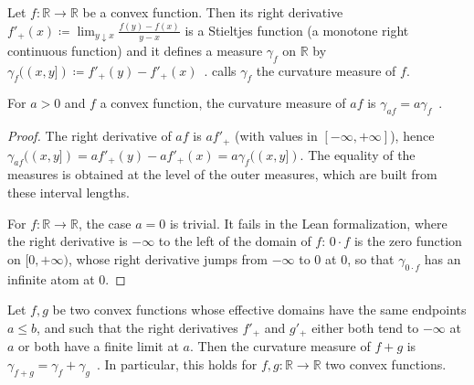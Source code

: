 \begin{definition}
  \label{def:curvatureMeasure}
  \leanok
  \uses{}
  Let $f: \mathbb{R} \to \mathbb{R}$ be a convex function. Then its right derivative $f'_+(x) \coloneqq \lim_{y \downarrow x}\frac{f(y) - f(x)}{y - x}$ is a Stieltjes function (a monotone right continuous function) and it defines a measure $\gamma_f$ on $\mathbb{R}$ by $\gamma_f((x,y]) \coloneqq f'_+(y) - f'_+(x)$~. \cite{liese2012phi} calls $\gamma_f$ the curvature measure of $f$.
\end{definition}


\begin{lemma}
  \label{lem:curvatureMeasure_mul}
  \leanok
  For $a > 0$ and $f$ a convex function, the curvature measure of $af$ is $\gamma_{af} = a \gamma_f$~.
\end{lemma}

\begin{proof}\leanok
\uses{}
The right derivative of $af$ is $a f'_+$ (with values in $[-\infty, +\infty]$), hence $\gamma_{af}((x,y]) = a f'_+(y) - a f'_+(x) = a \gamma_f((x,y])$. The equality of the measures is obtained at the level of the outer measures, which are built from these interval lengths.

For $f: \mathbb{R} \to \mathbb{R}$, the case $a = 0$ is trivial. It fails in the Lean formalization, where the right derivative is $-\infty$ to the left of the domain of $f$: $0 \cdot f$ is the zero function on $[0, +\infty)$, whose right derivative jumps from $-\infty$ to $0$ at $0$, so that $\gamma_{0 \cdot f}$ has an infinite atom at $0$.
\end{proof}


\begin{lemma}
  \label{lem:curvatureMeasure_add}
  \leanok
  Let $f,g$ be two convex functions whose effective domains have the same endpoints $a \le b$, and such that the right derivatives $f'_+$ and $g'_+$ either both tend to $-\infty$ at $a$ or both have a finite limit at $a$. Then the curvature measure of $f+g$ is $\gamma_{f+g} = \gamma_f + \gamma_g$~.
  In particular, this holds for $f,g: \mathbb{R} \to \mathbb{R}$ two convex functions.
\end{lemma}


